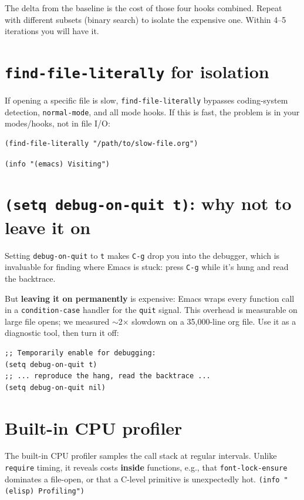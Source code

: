 The delta from the baseline is the cost of those four hooks combined. Repeat with different subsets (binary search) to isolate the expensive one. Within 4--5 iterations you will have it.

\section{\texttt{find-file-literally} for isolation}\label{find-file-literally-for-isolation}

If opening a specific file is slow, \texttt{find-file-literally} bypasses coding-system detection, \texttt{normal-mode}, and all mode hooks. If this is fast, the problem is in your modes/hooks, not in file I/O:

\begin{verbatim}
(find-file-literally "/path/to/slow-file.org")
\end{verbatim}

\texttt{(info "(emacs) Visiting")}

\section{\texttt{(setq debug-on-quit t)}: why not to leave it on}\label{setq-debug-on-quit-t-why-not-to-leave-it-on}

Setting \texttt{debug-on-quit} to \texttt{t} makes \texttt{C-g} drop you into the debugger, which is invaluable for finding where Emacs is stuck: press \texttt{C-g} while it's hung and read the backtrace.

But \textbf{leaving it on permanently} is expensive: Emacs wraps every function call in a \texttt{condition-case} handler for the \texttt{quit} signal. This overhead is measurable on large file opens; we measured \(\sim\)2× slowdown on a 35,000-line org file. Use it as a diagnostic tool, then turn it off:

\begin{verbatim}
;; Temporarily enable for debugging:
(setq debug-on-quit t)
;; ... reproduce the hang, read the backtrace ...
(setq debug-on-quit nil)
\end{verbatim}

\section{Built-in CPU profiler}\label{built-in-cpu-profiler}

The built-in CPU profiler samples the call stack at regular intervals. Unlike \texttt{require} timing, it reveals costs \textbf{inside} functions, e.g., that \texttt{font-lock-ensure} dominates a file-open, or that a C-level primitive is unexpectedly hot. \texttt{(info "(elisp) Profiling")}

